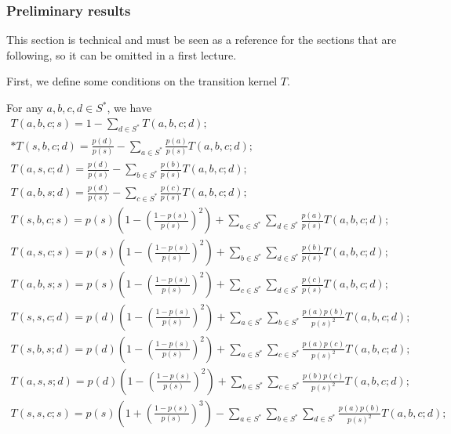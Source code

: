 \documentclass[AHL,Unicode,longabstracts]{cedram}
\newcounter{a}
\newenvironment{cond}{\refstepcounter{a}{\upshape\emph{Cond.~\thea}}\pointir}{}
\begin{document}
\subsubsection{Preliminary results}

This section is technical and must be seen as a reference for the sections that are following, so it can be omitted in a first lecture.

First, we define some conditions on the transition kernel $T$.


\begin{cond} \label{cond:Ts}
For any $a,b,c,d \in S^*$, we have
\begingroup
\allowdisplaybreaks
\begin{gather}\label{eq:Ts-abcs}
T(a,b,c;s) = 1 - \sum_{d \in S^*} T(a,b,c;d);
\\*
\label{eq:Ts-sbcd}
T(s,b,c;d) = \frac{p(d)}{p(s)} - \sum_{a \in S^*} \frac{p(a)}{p(s)} T(a,b,c;d);
\\
\label{eq:Ts-ascd}
T(a,s,c;d) = \frac{p(d)}{p(s)} - \sum_{b \in S^*} \frac{p(b)}{p(s)} T(a,b,c;d);
\\
\label{eq:Ts-absd}
T(a,b,s;d) = \frac{p(d)}{p(s)} - \sum_{c \in S^*} \frac{p(c)}{p(s)} T(a,b,c;d);
\\
\label{eq:Ts-sbcs}
T(s,b,c;s) = p(s) \left(1 - \left(\frac{1-p(s)}{p(s)} \right)^2 \right) + \sum_{a \in S^*} \sum_{d \in S^*} \frac{p(a)}{p(s)}T(a,b,c;d);
\\
\label{eq:Ts-ascs}
T(a,s,c;s) = p(s) \left(1 - \left(\frac{1-p(s)}{p(s)} \right)^2 \right) + \sum_{b \in S^*} \sum_{d \in S^*} \frac{p(b)}{p(s)}T(a,b,c;d);
\\
\label{eq:Ts-abss}
T(a,b,s;s) = p(s) \left(1 - \left(\frac{1-p(s)}{p(s)} \right)^2 \right) + \sum_{c \in S^*} \sum_{d \in S^*} \frac{p(c)}{p(s)}T(a,b,c;d);
\\
\label{eq:Ts-sscd}
T(s,s,c;d) = p(d) \left(1 - \left(\frac{1-p(s)}{p(s)} \right)^2 \right) + \sum_{a \in S^*} \sum_{b \in S^*} \frac{p(a)p(b)}{p(s)^2}T(a,b,c;d);
\\
\label{eq:Ts-sbsd}
T(s,b,s;d) = p(d) \left(1 - \left(\frac{1-p(s)}{p(s)} \right)^2 \right) + \sum_{a \in S^*} \sum_{c \in S^*} \frac{p(a)p(c)}{p(s)^2}T(a,b,c;d);
\\
\label{eq:Ts-assd}
T(a,s,s;d) = p(d) \left(1 - \left(\frac{1-p(s)}{p(s)} \right)^2 \right) + \sum_{b \in S^*} \sum_{c \in S^*} \frac{p(b)p(c)}{p(s)^2}T(a,b,c;d);
\\
\label{eq:Ts-sscs}
T(s,s,c;s) = p(s) \left(1 + \left(\frac{1-p(s)}{p(s)} \right)^3 \right) - \sum_{a \in S^*} \sum_{b \in S^*} \sum_{d \in S^*} \frac{p(a)p(b)}{p(s)^2}T(a,b,c;d);

\end{gather}
\end{cond}
\end{document}
